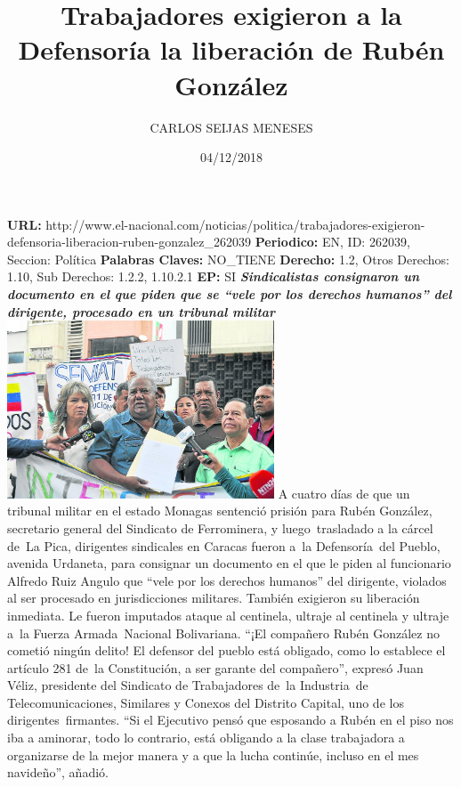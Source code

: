 \documentclass{article}%
\title{\textbf{Trabajadores exigieron a la Defensoría la liberación de Rubén González}}%
\author{CARLOS SEIJAS MENESES}%
\date{04/12/2018}%
\begin{document}
%
\normalsize%
\maketitle%
\textbf{URL: }%
http://www.el{-}nacional.com/noticias/politica/trabajadores{-}exigieron{-}defensoria{-}liberacion{-}ruben{-}gonzalez\_262039\newline%
%
\textbf{Periodico: }%
EN, %
ID: %
262039, %
Seccion: %
Política\newline%
%
\textbf{Palabras Claves: }%
NO\_TIENE\newline%
%
\textbf{Derecho: }%
1.2, %
Otros Derechos: %
1.10, %
Sub Derechos: %
1.2.2, 1.10.2.1\newline%
%
\textbf{EP: }%
SI\newline%
\newline%
%
\textbf{\textit{Sindicalistas consignaron un documento en el que piden que se “vele por los derechos humanos” del dirigente, procesado en un tribunal militar}}%
\newline%
\newline%
%
\includegraphics[width=300px]{92.jpg}%
\newline%
%
A cuatro días de que un tribunal militar en el estado Monagas sentenció prisión para Rubén González, secretario general del Sindicato de Ferrominera, y luego~trasladado a la cárcel de~La Pica, dirigentes sindicales en Caracas fueron a~la Defensoría~del Pueblo, avenida Urdaneta, para consignar un documento en el que le piden al funcionario Alfredo Ruiz Angulo que “vele por los derechos humanos” del dirigente, violados al ser procesado en jurisdicciones militares. También exigieron su liberación inmediata. Le fueron imputados ataque al centinela, ultraje al centinela y ultraje a~la Fuerza Armada~Nacional Bolivariana.%
\newline%
%
“¡El compañero Rubén González no cometió ningún delito! El defensor del pueblo está obligado, como lo establece el artículo 281 de~la Constitución, a ser garante del compañero”, expresó Juan Véliz, presidente del Sindicato de Trabajadores de~la Industria~de Telecomunicaciones, Similares y Conexos del Distrito Capital, uno de los dirigentes~firmantes. “Si el Ejecutivo pensó que esposando a Rubén en el piso nos iba a aminorar, todo lo contrario, está obligando a la clase trabajadora a organizarse de la mejor manera y a que la lucha continúe, incluso en el mes navideño”, añadió.%
\end{document}
